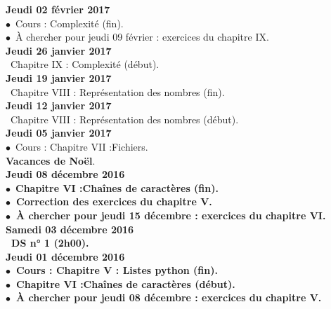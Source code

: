 \documentclass[12pt,a4paper]{article}
\begin{document}
\noindent\textbf{\bf Jeudi 02 février 2017 \rm}\\
$\bullet$\ Cours : Complexité (fin).\\
$\bullet$\ À chercher pour jeudi 09 février : exercices du chapitre IX.
\vspace{.4cm}\\

\noindent\textbf{\bf Jeudi 26 janvier 2017 \rm}\\
\bu\ Chapitre IX : Complexité (début).\vspace{.4cm}\\

\noindent\textbf{\bf Jeudi 19 janvier 2017 \rm}\\
\bu\ Chapitre VIII : Représentation des nombres (fin).\vspace{.4cm}\\

\noindent\textbf{\bf Jeudi 12 janvier 2017 \rm}\\
\bu\ Chapitre VIII : Représentation des nombres (début).\vspace{.4cm}\\

\noindent\textbf{\bf Jeudi 05 janvier 2017 \rm}\\
$\bullet$\ Cours : Chapitre VII :\rm Fichiers.\vspace{.4cm}\\
 
\noindent\textbf{\bf Vacances de Noël}.\vspace{.4cm}\\

\noindent\textbf{\bf Jeudi 08 décembre 2016 \rm}\\
$\bullet$\ \bf Chapitre VI :\rm Chaînes de caractères (fin).\\
$\bullet$\ Correction des exercices du chapitre V.\\
$\bullet$\ À chercher pour jeudi 15 décembre : exercices du chapitre VI.
\vspace{.4cm}\\
  
\noindent\textbf{\bf Samedi 03 décembre 2016 \rm}\\
\bu\ DS n° 1 (2h00).\vspace{.4cm}\\

\noindent\textbf{\bf Jeudi 01 décembre 2016 \rm}\\
$\bullet$\ Cours : \bf Chapitre V \rm : Listes python (fin).\\
$\bullet$\ \bf Chapitre VI :\rm Chaînes de caractères (début).\\
$\bullet$\ À chercher pour jeudi 08 décembre : exercices du chapitre V.\vspace{.4cm}\\
\end{document}

